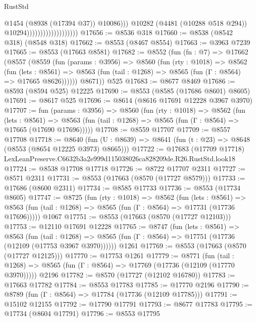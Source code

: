 \begin{lexlean}{RustStd}
\begin{coremodule}
                                                @1454
                                                (@8938 (@17394 @37))
                                                @10086)))
                                          @10282
                                          (@4481 (@10288 @518 @294))
                                          @10294)))))))))))))))))))
@17656 := @8536 @318
@17660 := @8538 (@8542 @318) (@8548 @318)
@17662 := @8553 (@8467 @8554)
@17663 := @3963 @7239
@17665 := @8553 (@17663 @8581)
@17682 := @8552
    (fun (fn : @7) =>
    @17662
      (@8557
        (@8559
          (fun (params : @3956) =>
          @8560
            (fun (rty : @1018) =>
            @8562
              (fun (lets : @8561) =>
              @8563 (fun (tail : @1268) => @8565 (fun (Γ : @8564) => @17665 @8626))))))
        @8671))
    @525
@17683 := @8677 @8469
@17686 := @8593 (@8594 @525) @12225
@17690 := @8553 (@8585 (@17686 @8601) @8605)
@17691 := @8617 @525
@17696 := @8614 (@8616 @17691 @12228 @3967 @3970)
@17707 := fun (params : @3956) =>
  @8560
    (fun (rty : @1018) =>
    @8562
      (fun (lets : @8561) =>
      @8563 (fun (tail : @1268) => @8565 (fun (Γ : @8564) => @17665 (@17690 @17696)))))
@17708 := @8559 @17707
@17709 := @8557 @17708
@17718 := @8640
    (fun (U : @8639) => @8641 (fun (t : @23) => @8648 (@8553 (@8654 @12225 @3973) @8665)))
@17722 := @17683
    (@17709 @17718)
    LexLeanPreserve.C6632b3a2e999d115038026ca828209de.R26.RustStd.look18
@17724 := @8538 @17708 @17718
@17726 := @8722 @17707 @2311
@17727 := @8571 @2311
@17731 := @8553 (@17663 (@8570 (@17727 @8579)))
@17733 := @17686 (@8600 @2311)
@17734 := @8585 @17733
@17736 := @8553 (@17734 @8605)
@17747 := @8725
    (fun (rty : @1018) =>
    @8562
      (fun (lets : @8561) =>
      @8563 (fun (tail : @1268) => @8565 (fun (Γ : @8564) => @17731 (@17736 @17696)))))
    @1067
@17751 := @8553 (@17663 (@8570 (@17727 @12103)))
@17753 := @12110 @17691 @12228
@17765 := @8747
    (fun (lets : @8561) =>
    @8563
      (fun (tail : @1268) =>
      @8565 (fun (Γ : @8564) => @17751 (@17736 (@12109 (@17753 @3967 @3970))))))
    @1261
@17769 := @8553 (@17663 (@8570 (@17727 @12125)))
@17770 := @17753 @1261
@17779 := @8771
    (fun (tail : @1268) => @8565 (fun (Γ : @8564) => @17769 (@17736 (@12109 (@17770 @3970)))))
    @2196
@17782 := @8570 (@17727 (@12102 @16780))
@17783 := @17663 @17782
@17784 := @8553 @17783
@17785 := @17770 @2196
@17790 := @8789 (fun (Γ : @8564) => @17784 (@17736 (@12109 @17785)))
@17791 := @15102 @12155
@17792 := @17790 @17791
@17793 := @8677 @17783
@17795 := @17734 (@8604 @17791)
@17796 := @8553 @17795

\end{coremodule}
\end{lexlean}

